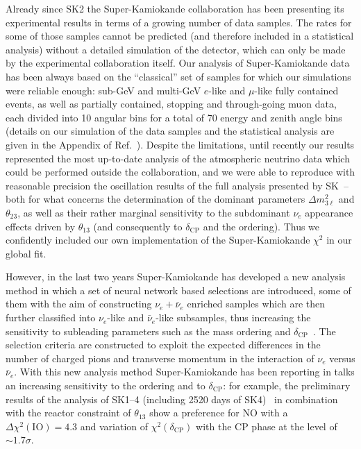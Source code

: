 \documentclass[a4paper, 11pt]{article}
\newcommand{\Dmq}{\Delta m^2}
\begin{document}
Already since SK2 the Super-Kamiokande collaboration has been
presenting its experimental results in terms of a growing number of
data samples.  The rates for some of those samples cannot be predicted
(and therefore included in a statistical analysis) without a detailed
simulation of the detector, which can only be made by the experimental
collaboration itself. Our analysis of Super-Kamiokande data has been
always based on the ``classical'' set of samples for which our
simulations were reliable enough: sub-GeV and multi-GeV $e$-like and
$\mu$-like fully contained events, as well as partially contained,
stopping and through-going muon data, each divided into 10 angular
bins for a total of 70 energy and zenith angle bins (details on our
simulation of the data samples and the statistical analysis are given
in the Appendix of Ref.~\cite{GonzalezGarcia:2007ib}).  Despite the
limitations, until recently our results represented the most
up-to-date analysis of the atmospheric neutrino data which could be
performed outside the collaboration, and we were able to reproduce
with reasonable precision the oscillation results of the full analysis
presented by SK~-- both for what concerns the determination of the
dominant parameters $\Dmq_{3\ell}$ and $\theta_{23}$, as well as their
rather marginal sensitivity to the subdominant $\nu_e$ appearance
effects driven by $\theta_{13}$ (and consequently to
$\delta_\text{CP}$ and the ordering). Thus we confidently included our
own implementation of the Super-Kamiokande $\chi^2$ in our global fit.

However, in the last two years Super-Kamiokande has developed a new
analysis method in which a set of neural network based selections are
introduced, some of them with the aim of constructing $\nu_e +
\bar\nu_e$ enriched samples which are then further classified into
$\nu_e$-like and $\bar\nu_e$-like subsamples, thus increasing the
sensitivity to subleading parameters such as the mass ordering and
$\delta_\text{CP}$~\cite{Wendell:2014dka, skatm:thesis}.  The
selection criteria are constructed to exploit the expected differences
in the number of charged pions and transverse momentum in the
interaction of $\nu_e$ versus $\bar\nu_e$.  With this new analysis
method Super-Kamiokande has been reporting in talks an increasing
sensitivity to the ordering and to $\delta_\text{CP}$: for example,
the preliminary results of the analysis of SK1--4 (including 2520 days
of SK4)~\cite{skatm:nufact2016} in combination with the reactor
constraint of $\theta_{13}$ show a preference for NO with a
$\Delta\chi^2(\text{IO}) = 4.3$ and variation of
$\chi^2(\delta_\text{CP})$ with the CP phase at the level of $\sim
1.7\sigma$.
\end{document}
